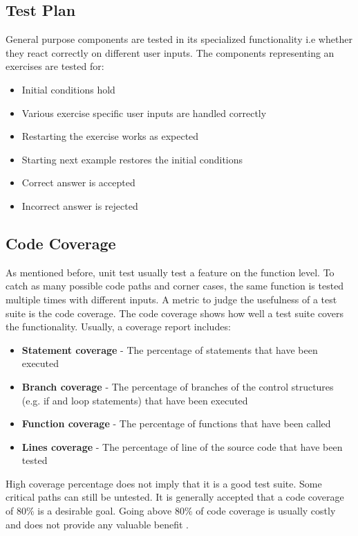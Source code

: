 \subsection*{Test Plan}

General purpose components are tested in its specialized functionality i.e whether they react correctly on different user inputs. 
The components representing an exercises are tested for:

\begin{itemize}
    \item Initial conditions hold
    \item Various exercise specific user inputs are handled correctly
    \item Restarting the exercise works as expected
    \item Starting next example restores the initial conditions
    \item Correct answer is accepted
    \item Incorrect answer is rejected
\end{itemize}

\subsection*{Code Coverage}
As mentioned before, unit test usually test a feature on the function level. To catch as many possible code paths and corner cases, the same function is tested multiple times with different inputs. 
A metric to judge the usefulness of a test suite is the code coverage. The code coverage shows how well a test suite covers the functionality. Usually, a coverage report includes:

\begin{itemize}
    \item \textbf{Statement coverage} - The percentage of statements that have been executed 
    \item \textbf{Branch coverage} - The percentage of branches of the control structures (e.g. if and loop statements) that have been executed
    \item \textbf{Function coverage} - The percentage of functions that have been called
    \item \textbf{Lines coverage} - The percentage of line of the source code that have been tested
\end{itemize}

High coverage percentage does not imply that it is a good test suite. Some critical paths can still be untested. It is generally accepted that a code coverage of 80\% is a desirable goal. Going above 80\% of code coverage is usually costly and does not provide any valuable benefit \cite{CodeCoverage}.

